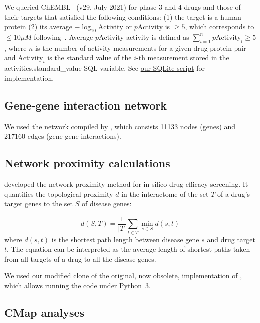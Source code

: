 \documentclass[letterpaper]{article}
\begin{document}
We queried ChEMBL~\citep{Gaulton2017} (v29, July 2021) for phase 3 and 4 drugs
and those of their targets that satisfied the following conditions: (1) the
target is a human protein (2) its average $-\log_{10}\mathrm{Activity}$ or
$p\mathrm{Activity}$ is $\ge 5$, which corresponds to $\le 10 \mu M$
following~\cite{Cheng2018}.  Average $p\mathrm{Activity}$ activity is defined
as $\sum_{i=1}^n p\mathrm{Activity}_i \ge 5$, where $n$ is the number of
activity measurements for a given drug-protein pair and $\mathrm{Activity}_i$
is the standard value of the $i$-th measurement stored in the
activities.standard\_value SQL variable.  See
\href{https://github.com/attilagk/CTNS-notebook/blob/main/2021-10-24-chembl-query/drug_target_avg_activity.sql}{our SQLite script} for implementation.

\subsection{Gene-gene interaction network}

We used the network compiled by \cite{Cheng2019}, which consists 11133 nodes
(genes) and 217160 edges (gene-gene interactions).

\subsection{Network proximity calculations}

\cite{Guney2016} developed the network proximity method for in silico drug efficacy screening.  It
quantifies the topological proximity $d$ in the interactome of the set $T$ of a drug's target genes
to the set $S$ of disease genes: 

\begin{equation}
  d(S, T) = \frac{1}{|T|}\sum_{t \in T} \min_{s \in S} d(s, t)
\end{equation}
where $d(s,t)$ is the shortest path length between disease gene $s$ and drug
target $t$.  The equation can be interpreted as the average length of shortest
paths taken from all targets of a drug to all the disease genes.

We used \href{https://github.com/attilagk/guney_code}{our modified clone} of
the original, now obsolete, implementation of \cite{Guney2016}, which allows
running the code under Python~3.

\subsection{CMap analyses}
\end{document}
